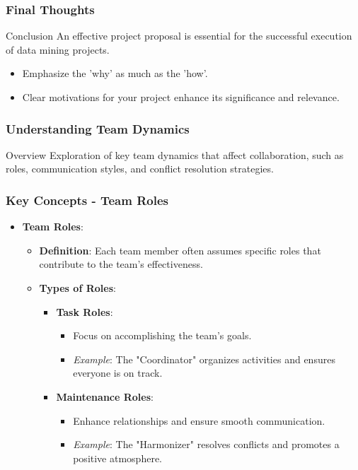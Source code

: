 \documentclass[aspectratio=169]{beamer}
\begin{document}
\begin{frame}[fragile]
    \frametitle{Final Thoughts}
    \begin{block}{Conclusion}
        An effective project proposal is essential for the successful execution of data mining projects.
    \end{block}
    \begin{itemize}
        \item Emphasize the 'why' as much as the 'how'.
        \item Clear motivations for your project enhance its significance and relevance.
    \end{itemize}
\end{frame}

\begin{frame}[fragile]
    \frametitle{Understanding Team Dynamics}
    \begin{block}{Overview}
        Exploration of key team dynamics that affect collaboration, such as roles, communication styles, and conflict resolution strategies.
    \end{block}
\end{frame}

\begin{frame}[fragile]
    \frametitle{Key Concepts - Team Roles}
    \begin{itemize}
        \item \textbf{Team Roles}:
        \begin{itemize}
            \item \textbf{Definition}: Each team member often assumes specific roles that contribute to the team's effectiveness.
            \item \textbf{Types of Roles}:
            \begin{itemize}
                \item \textbf{Task Roles}:
                \begin{itemize}
                    \item Focus on accomplishing the team's goals.
                    \item \textit{Example}: The "Coordinator" organizes activities and ensures everyone is on track.
                \end{itemize}
                \item \textbf{Maintenance Roles}:
                \begin{itemize}
                    \item Enhance relationships and ensure smooth communication.
                    \item \textit{Example}: The "Harmonizer" resolves conflicts and promotes a positive atmosphere.
                \end{itemize}
            \end{itemize}
        \end{itemize}
    \end{itemize}
\end{frame}
\end{document}
